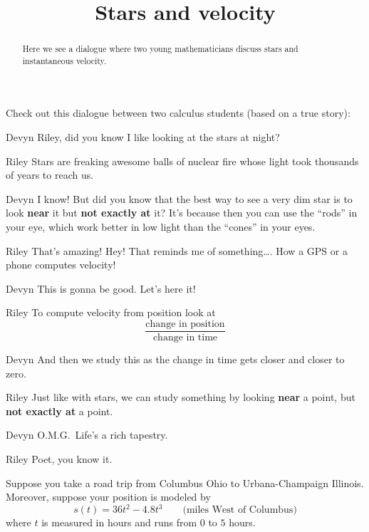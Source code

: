 \documentclass{ximera}
\title[Break-Ground:]{Stars and velocity}
\begin{document}
\begin{abstract}
Here we see a dialogue where two young mathematicians discuss stars
and instantaneous velocity.
\end{abstract}
\maketitle

Check out this dialogue between two calculus students (based on a true
story):

\begin{dialogue}
\item[Devyn] Riley, did you know I like looking at the stars at night?
\item[Riley] Stars are freaking awesome balls of nuclear fire whose
  light took thousands of years to reach us.
\item[Devyn] I know! But did you know that the best way to see a very
  dim star is to look \textbf{near} it but \textbf{not exactly at} it? It's
  because then you can use the ``rods'' in your eye, which work better
  in low light than the ``cones'' in your eyes.
\item[Riley] That's amazing! Hey! That reminds me of something\dots.
  How a GPS or a phone computes velocity!
\item[Devyn] This is gonna be good. Let's here it!
\item[Riley] To compute velocity from position look at
  \[
  \frac{\text{change in position}}{\text{change in time}}
  \]
\item[Devyn] And then we study this as the change in time gets closer
  and closer to zero.
\item[Riley] Just like with stars, we can study something by looking
  \textbf{near} a point, but \textbf{not exactly at} a point.
\item[Devyn] O.M.G.\ Life's a rich tapestry.
\item[Riley] Poet, you know it.
\end{dialogue}


\begin{problem}
  Suppose you take a road trip from Columbus Ohio to Urbana-Champaign
  Illinois. Moreover, suppose your position is modeled by
  \[
  s(t) = 36t^2 -4.8t^3 \qquad\text{(miles West of Columbus)} %
  \]
  where $t$ is measured in hours and runs from $0$ to $5$ hours. 
\end{problem}
\end{document}

